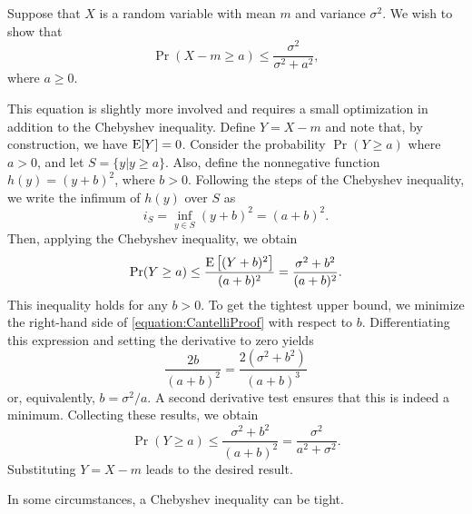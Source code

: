\begin{example}
Suppose that $X$ is a random variable with mean $m$ and variance $\sigma^2$.
We wish to show that
\begin{equation*}
\Pr ( X - m \geq a ) \leq \frac{\sigma^2}{\sigma^2 + a^2},
\end{equation*}
where $a \geq 0$.

This equation is slightly more involved and requires a small optimization in addition to the Chebyshev inequality.
Define $Y = X - m$ and note that, by construction, we have $\mathrm{E} [Y] = 0$.
Consider the probability $\Pr (Y \geq a)$ where $a > 0$, and let $S = \{ y | y \geq a \}$.
Also, define the nonnegative function $h(y) = (y + b)^2$, where $b > 0$.
Following the steps of the Chebyshev inequality, we write the infimum of $h(y)$ over $S$ as
\begin{equation*}
i_S = \inf_{y \in S} (y + b)^2 = (a + b)^2 .
\end{equation*}
Then, applying the Chebyshev inequality, we obtain
\begin{equation} \label{equation:CantelliProof}
\Pr (Y \geq a) \leq \frac{ \mathrm{E} \left[ (Y + b)^2 \right] }{(a + b)^2}
= \frac{ \sigma^2 + b^2 }{ (a + b)^2 } .
\end{equation}
This inequality holds for any $b > 0$.
To get the tightest upper bound, we minimize the right-hand side of \eqref{equation:CantelliProof} with respect to $b$.
Differentiating this expression and setting the derivative to zero yields
\begin{equation*}
\frac{ 2 b }{(a + b)^2 } = \frac{ 2 \left( \sigma^2 + b^2 \right) }{(a + b)^3}
\end{equation*}
or, equivalently, $b = \sigma^2 / a$.
A second derivative test ensures that this is indeed a minimum.
Collecting these results, we obtain
\begin{equation*}
\Pr (Y \geq a) \leq \frac{ \sigma^2 + b^2 }{ (a + b)^2 }
= \frac{ \sigma^2 }{ a^2 + \sigma^2 } .
\end{equation*}
Substituting $Y = X - m$ leads to the desired result.
\end{example}

In some circumstances, a Chebyshev inequality can be tight.

